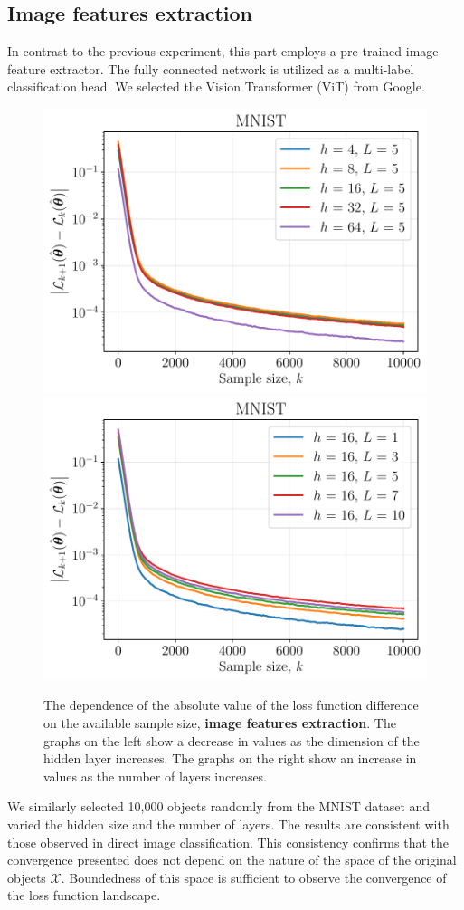 \documentclass{article}
\begin{document}
\subsection{Image features extraction} 

In contrast to the previous experiment, this part employs a pre-trained image feature extractor. The fully connected network is utilized as a multi-label classification head. We selected the Vision Transformer (ViT) \cite{wu2020visual} from Google.

\begin{figure}[ht]
    \centering
    \includegraphics[width=0.5\linewidth]{figs_extraction/mnist_hidden_size.pdf}\hfill
    \includegraphics[width=0.5\linewidth]{figs_extraction/mnist_num_layers.pdf}
    \caption{The dependence of the absolute value of the loss function difference on the available sample size, \textbf{image features extraction}. The graphs on the left show a decrease in values as the dimension of the hidden layer increases. The graphs on the right show an increase in values as the number of layers increases.}
    \label{fig:mnist-extraction}
\end{figure}

We similarly selected 10,000 objects randomly from the MNIST dataset and varied the hidden size and the number of layers. The results are consistent with those observed in direct image classification. This consistency confirms that the convergence presented does not depend on the nature of the space of the original objects $\mathcal{X}$. Boundedness of this space is sufficient to observe the convergence of the loss function landscape.
\end{document}
